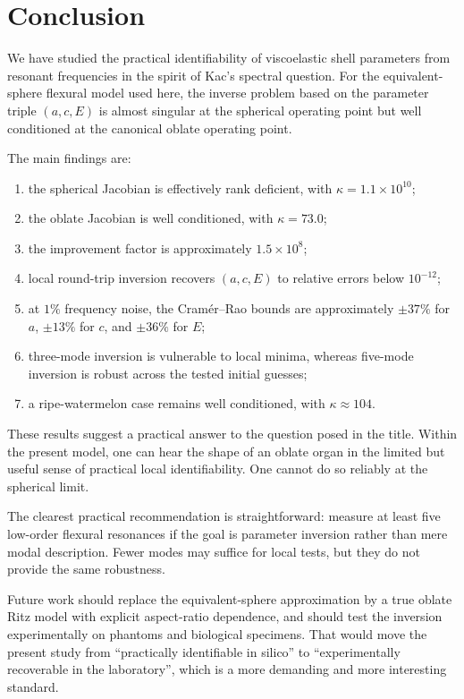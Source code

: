 \section{Conclusion}\label{sec:conclusion}

We have studied the practical identifiability of viscoelastic shell parameters
from resonant frequencies in the spirit of Kac's spectral question.  For the
equivalent-sphere flexural model used here, the inverse problem based on the
parameter triple $(a,c,E)$ is almost singular at the spherical operating point
but well conditioned at the canonical oblate operating point.

The main findings are:
\begin{enumerate}
  \item the spherical Jacobian is effectively rank deficient, with
  $\kappa = 1.1 \times 10^{10}$;
  \item the oblate Jacobian is well conditioned, with $\kappa = 73.0$;
  \item the improvement factor is approximately $1.5 \times 10^{8}$;
  \item local round-trip inversion recovers $(a,c,E)$ to relative errors below
  $10^{-12}$;
  \item at $1\%$ frequency noise, the Cram\'er--Rao bounds are approximately
  $\pm 37\%$ for $a$, $\pm 13\%$ for $c$, and $\pm 36\%$ for $E$;
  \item three-mode inversion is vulnerable to local minima, whereas five-mode
  inversion is robust across the tested initial guesses;
  \item a ripe-watermelon case remains well conditioned, with
  $\kappa \approx 104$.
\end{enumerate}

These results suggest a practical answer to the question posed in the title.
Within the present model, one can hear the shape of an oblate organ in the
limited but useful sense of practical local identifiability.  One cannot do so
reliably at the spherical limit.

The clearest practical recommendation is straightforward: measure at least five
low-order flexural resonances if the goal is parameter inversion rather than
mere modal description.  Fewer modes may suffice for local tests, but they do
not provide the same robustness.

Future work should replace the equivalent-sphere approximation by a true oblate
Ritz model with explicit aspect-ratio dependence, and should test the inversion
experimentally on phantoms and biological specimens.  That would move the
present study from ``practically identifiable in silico'' to ``experimentally
recoverable in the laboratory'', which is a more demanding and more interesting
standard.
